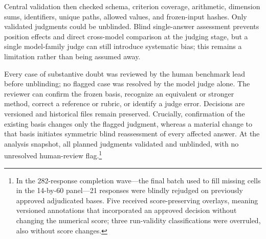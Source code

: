 \documentclass[11pt,a4paper,twocolumn]{article}
\begin{document}
Central validation then checked schema, criterion coverage, arithmetic,
dimension sums, identifiers, unique paths, allowed values, and frozen-input
hashes. Only validated judgments could be unblinded. Blind single-answer
assessment prevents position effects and direct cross-model comparison at the
judging stage, but a single model-family judge can still introduce systematic
bias; this remains a limitation rather than being assumed away.

Every case of substantive doubt was reviewed by the human benchmark lead
before unblinding; no flagged case was resolved by the model judge alone. The
reviewer can confirm the frozen basis, recognize an equivalent or stronger
method, correct a reference or rubric, or identify a judge error. Decisions are
versioned and historical files remain preserved. Crucially, confirmation of
the existing basis changes only the flagged judgment, whereas a material
change to that basis initiates symmetric blind reassessment of every affected
answer. At the analysis snapshot, all planned judgments validated and
unblinded, with no unresolved human-review flag.\footnote{In the 282-response
completion wave---the final batch used to fill missing cells in the 14-by-60
panel---21 responses were blindly rejudged on previously approved adjudicated
bases. Five received score-preserving overlays, meaning versioned annotations
that incorporated an approved decision without changing the numerical score;
three run-validity classifications were overruled, also without score changes.}
\end{document}
